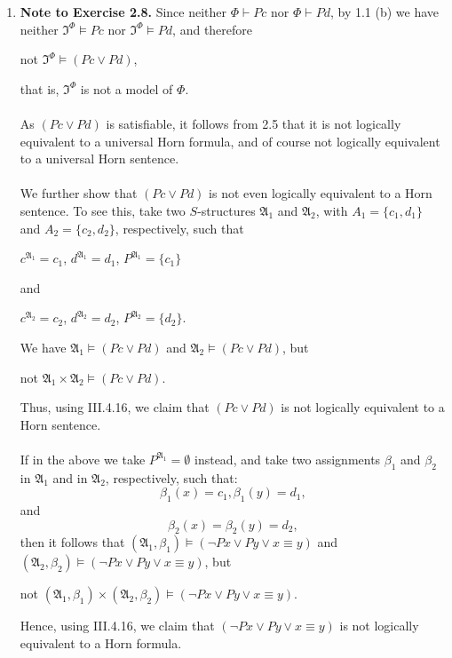 \begin{enumerate}[1.]
%
\item \textbf{Note to Exercise 2.8.} Since neither $\Phi \vdash Pc$ nor $\Phi \vdash Pd$, by 1.1 (b) we have neither $\mathfrak{I}^\Phi \models Pc$ nor $\mathfrak{I}^\Phi \models Pd$, and therefore
\begin{center}
not $\mathfrak{I}^\Phi \models (Pc \lor Pd)$,
\end{center}
that is, $\mathfrak{I}^\Phi$ is not a model of $\Phi$.\\
\ \\
As $(Pc \lor Pd)$ is satisfiable, it follows from 2.5 that it is not logically equivalent to a universal Horn formula, and of course not logically equivalent to a universal Horn sentence.\\
\ \\
We further show that $(Pc \lor Pd)$ is not even logically equivalent to a Horn sentence. To see this, take two $S$-structures $\mathfrak{A}_1$ and $\mathfrak{A}_2$, with $A_1 = \{ c_1, d_1 \}$ and $A_2 = \{ c_2, d_2 \}$, respectively, such that
\begin{center}
$c^{\mathfrak{A}_1} = c_1$, $d^{\mathfrak{A}_1} = d_1$, $P^{\mathfrak{A}_1} = \{ c_1 \}$
\end{center}
and
\begin{center}
$c^{\mathfrak{A}_2} = c_2$, $d^{\mathfrak{A}_2} = d_2$, $P^{\mathfrak{A}_2} = \{ d_2 \}$.
\end{center}
We have $\mathfrak{A}_1 \models (Pc \lor Pd)$ and $\mathfrak{A}_2 \models (Pc \lor Pd)$, but
\begin{center}
not $\mathfrak{A}_1 \times \mathfrak{A}_2 \models (Pc \lor Pd)$.
\end{center}
Thus, using III.4.16, we claim that $(Pc \lor Pd)$ is not logically equivalent to a Horn sentence.\\
\ \\
If in the above we take $P^{\mathfrak{A}_1} = \emptyset$ instead, and take two assignments $\beta_1$ and $\beta_2$ in $\mathfrak{A}_1$ and in $\mathfrak{A}_2$, respectively, such that:
\[
\beta_1 (x) = c_1, \beta_1 (y) = d_1,
\]
and
\[
\beta_2 (x) = \beta_2 (y) = d_2,
\]
then it follows that $(\mathfrak{A}_1, \beta_1) \models (\neg Px \lor Py \lor x \equiv y)$ and $(\mathfrak{A}_2, \beta_2) \models (\neg Px \lor Py \lor x \equiv y)$, but
\begin{center}
not $(\mathfrak{A}_1, \beta_1) \times (\mathfrak{A}_2, \beta_2) \models (\neg Px \lor Py \lor x \equiv y)$.
\end{center}
Hence, using III.4.16, we claim that $(\neg Px \lor Py \lor x \equiv y)$ is not logically equivalent to a Horn formula.

\end{enumerate}
